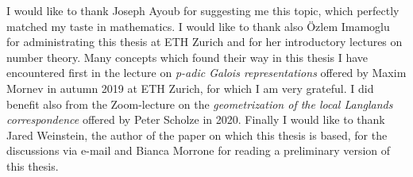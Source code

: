 \begin{acknowledgements}
I would like to thank Joseph Ayoub for suggesting me this topic, which perfectly matched my taste in mathematics. I would like to thank also Özlem Imamoglu for  administrating this thesis at ETH Zurich and for her introductory lectures on number theory. Many concepts which found their way in this thesis I have encountered first in the lecture on \emph{p-adic Galois representations} offered by Maxim Mornev in autumn 2019 at ETH Zurich, for which I am very grateful. I did benefit also from the Zoom-lecture on the \emph{geometrization of the local Langlands correspondence} offered by Peter Scholze in 2020. Finally I would like to thank Jared Weinstein, the author of the paper on which this thesis is based, for the discussions via e-mail  and Bianca Morrone for reading a preliminary version of this thesis. 
\end{acknowledgements}
